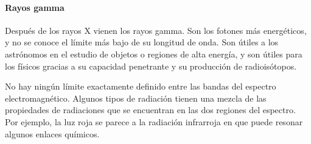\documentclass[12pt]{article}
\begin{document}
\paragraph{Rayos gamma}
Despu\'es de los rayos X vienen los rayos gamma. Son los fotones m\'as energ\'eticos, y no se conoce el l\'imite m\'as bajo de su longitud de onda. Son \'utiles a los astr\'onomos en el estudio de objetos o regiones de alta energ\'ia, y son \'utiles para los f\'isicos gracias a su capacidad penetrante y su producci\'on de radiois\'otopos.
\vspace{0.4cm}

No hay ning\'un l\'imite exactamente definido entre las bandas del espectro electromagn\'etico. Algunos tipos de radiaci\'on tienen una mezcla de las propiedades de radiaciones que se encuentran en las dos regiones del espectro. Por ejemplo, la luz roja se parece a la radiaci\'on infrarroja en que puede resonar algunos enlaces qu\'imicos.
\end{document}
